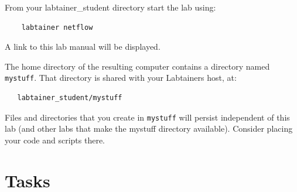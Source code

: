 From your labtainer_student directory start the lab using:
\begin{verbatim}
    labtainer netflow
\end{verbatim}
\noindent A link to this lab manual will be displayed.  

The home directory of the resulting computer contains a directory named {\tt mystuff}.  That directory is shared with your Labtainers host,
at:
\begin{verbatim}
   labtainer_student/mystuff
\end{verbatim}
\noindent Files and directories that you create in {\tt mystuff} will persist independent of this lab (and other labs that make the mystuff
directory available).  Consider placing your code and scripts there.
\section{Tasks}  
